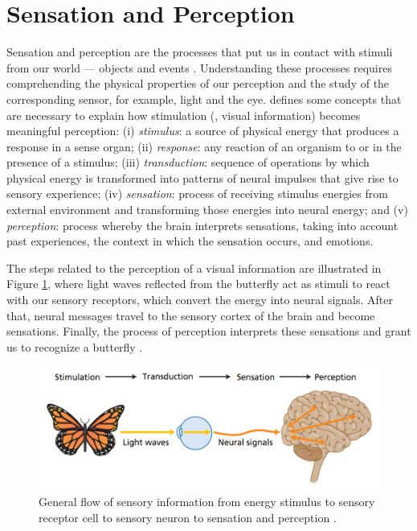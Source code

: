 
\section{Sensation and Perception}
\label{sec:SensationAndPerception}

Sensation and perception are the processes that put us in contact with stimuli from our world --- objects and events \cite{King2012}. Understanding these processes requires comprehending the physical properties of our perception and the study of the corresponding sensor,
for example, light and the eye. \citet{Lemma2005} defines some concepts that are necessary to explain how stimulation (\eg, visual information) becomes meaningful perception: (i) {\it stimulus}: a source of physical energy that produces a response in a sense organ; (ii) {\it response}: any reaction of an organism to or in the presence of a stimulus; (iii) {\it transduction}: sequence of operations by which physical energy is transformed into patterns of neural impulses that give rise to sensory experience; (iv) {\it sensation}: process of receiving stimulus energies from external environment and transforming those energies into neural energy; and (v) {\it perception}: process whereby the brain interprets sensations, taking into account past experiences, the context in which the sensation occurs, and emotions.

The steps related to the perception of a visual information are illustrated in Figure \ref{fig:flow}, where light waves reflected from the butterfly act as stimuli to react with our sensory receptors, which convert the energy into neural signals. After that, neural messages travel to the sensory cortex of the brain and become sensations. Finally, the process of perception interprets these sensations and grant us to recognize a butterfly \cite{Zimbardo2012}.

\begin{figure}[h]
	\centering
	\includegraphics[width=0.73\linewidth]{__Images/02/flow.png}
	\caption[General flow of sensory information]{General flow of sensory information from energy stimulus to sensory receptor cell to sensory neuron to sensation and perception \cite{Zimbardo2012}.}
	\label{fig:flow}
\end{figure}

